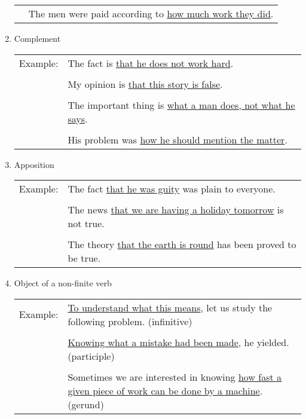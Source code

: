 \begin{enumerate}
\begin{tabular}{ll}
            & The men were paid according to \underline{how much work they did}.
        \end{tabular}
    \item Complement
        \newline
        \begin{tabular}{ll}
            Example:
            & The fact is \underline{that he does not work hard}.
            \\ \\
            & My opinion is \underline{that this story is false}.
            \\ \\
            & The important thing is \underline{what a man does, not what he
            says}.
            \\ \\
            & His problem was \underline{how he should mention the matter}.
        \end{tabular}
    \item Apposition
        \newline
        \begin{tabular}{ll}
            Example:
            & The fact \underline{that he was guity} was plain to everyone.
            \\ \\
            & The news \underline{that we are having a holiday tomorrow} is not
            true.
            \\ \\
            & The theory \underline{that the earth is round} has been proved to
            be true.
        \end{tabular}
    \item Object of a non-finite verb
        \newline
        \begin{tabular}{ll}
            Example:
            & \underline{To understand what this means}, let us study the
            following problem. (infinitive)
            \\ \\
            & \underline{Knowing what a mistake had been made}, he yielded.
            (participle)
            \\ \\
            & Sometimes we are interested in knowing \underline{how fast a given
            piece of work can be done by a machine}. (gerund)
        \end{tabular}
\end{enumerate}

